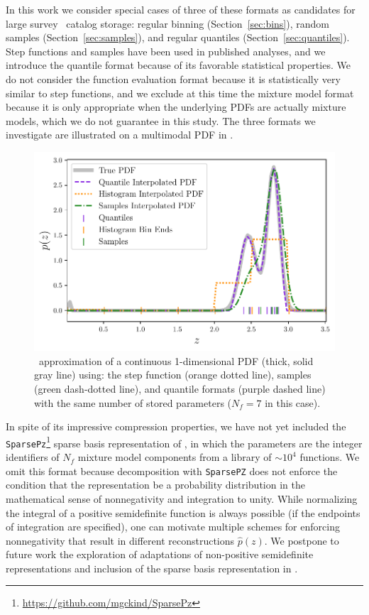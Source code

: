 In this work we consider special cases of three of these formats as candidates 
for large survey \pz\ catalog storage: regular binning 
(Section~\ref{sec:bins}), random samples (Section~\ref{sec:samples}), and 
regular quantiles (Section~\ref{sec:quantiles}).
Step functions and samples have been used in published analyses, and we 
introduce the quantile format because of its favorable statistical properties.
We do not consider the function evaluation format because it is statistically 
very similar to step functions, and we exclude at this time the mixture model 
format because it is only appropriate when the underlying PDFs are actually 
mixture models, which we do not guarantee in this study.
The three formats we investigate are illustrated on a multimodal PDF in 
.
\begin{figure}
	\begin{center}
		\includegraphics[width=0.5\columnwidth]{figures/qp/demo_pz.pdf}
		\caption{\qp\ approximation of a continuous 1-dimensional PDF (thick, solid 
			gray line) using: the step function (orange dotted line), samples (green 
			dash-dotted line), and quantile formats (purple dashed line) with the same 
			number of stored parameters ($N_{f}=7$ in this case).
			}
	\end{center}
\end{figure}

In spite of its impressive compression properties, we have not yet included the 
\texttt{SparsePz}\footnote{\url{https://github.com/mgckind/SparsePz}} sparse 
basis representation of \citet{carrasco_kind_sparse_2014}, in which the 
parameters are the integer identifiers of $N_{f}$ mixture model components from 
a library of $\sim10^{4}$ functions.
We omit this format because decomposition with \texttt{SparsePZ} does not 
enforce the condition that the representation be a probability distribution in 
the mathematical sense of nonnegativity and integration to unity.
While normalizing the integral of a positive semidefinite function is always 
possible (if the endpoints of integration are specified), one can motivate 
multiple schemes for enforcing nonnegativity that result in different 
reconstructions $\hat{p}(z)$.
We postpone to future work the exploration of adaptations of non-positive 
semidefinite representations and inclusion of the sparse basis representation 
in \qp.

